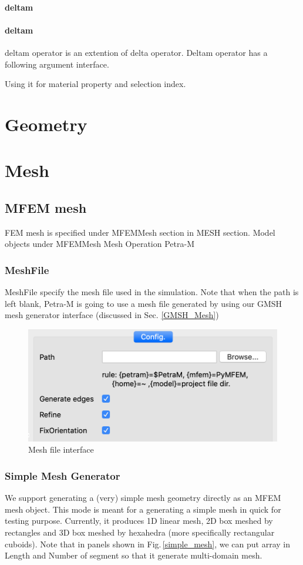 \documentclass[11pt,a4paper,final]{report}
\begin{document}
\subsubsection{deltam}
\subsubsection{deltam}
deltam operator is an extention of delta operator. Deltam operator has a following argument interface.


Using it for material property and selection index.
\chapter{Geometry}

\chapter{Mesh}

\section{MFEM mesh}
FEM mesh is specified under MFEMMesh section in MESH section. Model objects under MFEMMesh
Mesh Operation Petra-M

\subsection{MeshFile}
MeshFile specify the mesh file used in the simulation. Note that when the path is left blank, Petra-M is going to use
a mesh file generated by using our GMSH mesh generator interface (discussed in Sec. \ref{GMSH_Mesh})

\begin{figure}
\centering
\includegraphics[width=0.75\columnwidth]{figures/mesh_file_gui.png} 
\caption{ Mesh file interface}\label{mesh_file}
\end{figure}


\subsection{Simple Mesh Generator}
We support generating a (very) simple mesh geometry directly as an MFEM mesh object. 
This mode is meant for a generating a simple mesh in quick for testing purpose.
Currently, it produces 1D linear mesh, 2D box meshed by rectangles and 3D box meshed
by hexahedra (more specifically rectangular cuboids). 
Note that in panels shown in Fig.\,\ref{simple_mesh}, we can put array in Length and Number of 
segment so that it generate multi-domain mesh. 
\end{document}
